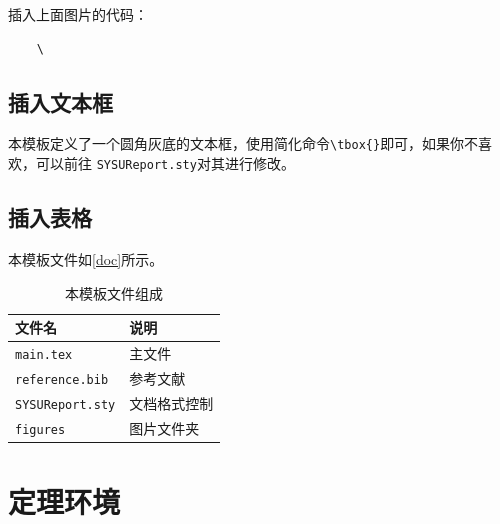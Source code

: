 \documentclass{CQMUReport}
\begin{document}
插入上面图片的代码：

\begin{verbatim}
    \
\end{verbatim}

\subsection{插入文本框}
本模板定义了一个圆角灰底的文本框，使用简化命令\verb|\tbox{}|即可，如果你不喜欢，可以前往 \texttt{SYSUReport.sty}对其进行修改。


\subsection{插入表格}

本模板文件如\autoref{doc}所示。

\begin{table}[!htbp]
    \centering
    \begin{tabular}{l|l}
        \hline
        文件名                  & 说明         \\
        \hline
        \texttt{main.tex}       & 主文件       \\
        \texttt{reference.bib}  & 参考文献     \\
        \texttt{SYSUReport.sty} & 文档格式控制 \\
        \texttt{figures}        & 图片文件夹   \\
        \hline
    \end{tabular}
    \caption{本模板文件组成}
    \label{doc}
\end{table}

\section{定理环境}
\begin{Theorem}
\end{Theorem}

\begin{Lemma}
\end{Lemma}

\begin{Corollary}
\end{Corollary}

\begin{Proposition}
\end{Proposition}

\begin{Definition}
\end{Definition}
\end{document}
